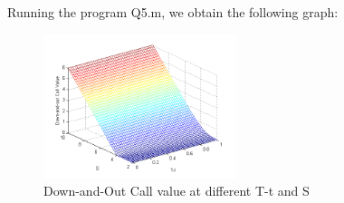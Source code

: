 \documentclass[a4paper]{article}
\begin{document}
\begin{enumerate}
\[\]
Running the program Q5.m, we obtain the following graph:
\begin{figure}[ht]
\centering
\includegraphics[width=0.5\textwidth]{Q5.png}
\caption{\label{fig:fig05} Down-and-Out Call value at different T-t and S}
\end{figure}

\end{enumerate}
\end{document}
